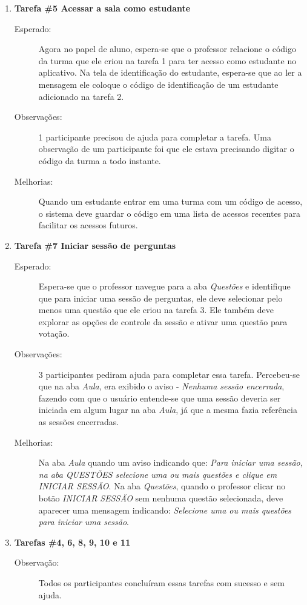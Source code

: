 \begin{enumerate}[label={},leftmargin=*]
  \item \textbf{Tarefa \#5 Acessar a sala como estudante}
  \begin{description}
    \item [Esperado:] Agora no papel de aluno, espera-se que o professor relacione o código da turma que
    ele criou na tarefa 1 para ter acesso como estudante no aplicativo. Na tela de identificação do estudante,
    espera-se que ao ler a mensagem ele coloque o código de identificação de um estudante adicionado na tarefa 2.
    \item [Observações:] 1 participante precisou de ajuda para completar a tarefa. Uma observação de um
    participante foi que ele estava precisando digitar o código da turma a todo instante.
    \item [Melhorias:] Quando um estudante entrar em uma turma com um código de acesso, o sistema
    deve guardar o código em uma lista de acessos recentes para facilitar os acessos futuros.
  \end{description}

  \item \textbf{Tarefa \#7 Iniciar sessão de perguntas}
  \begin{description}
    \item[Esperado:]  Espera-se que o professor navegue para a aba \textit{Questões} e identifique
    que para iniciar uma sessão de perguntas, ele deve selecionar pelo menos uma questão que ele criou
    na tarefa 3. Ele também deve explorar as opções de controle da sessão e ativar uma questão para votação.
    \item[Observações:] 3 participantes pediram ajuda para completar essa tarefa. Percebeu-se que
    na aba \textit{Aula}, era exibido o aviso - \textit{Nenhuma sessão encerrada}, fazendo
    com que o usuário entende-se que uma sessão deveria ser iniciada em algum lugar na aba \textit{Aula}, já que
    a mesma fazia referência as sessões encerradas.
    \item[Melhorias:] Na aba \textit{Aula} quando um aviso indicando que:
    \textit{Para iniciar uma sessão, na aba QUESTÕES selecione uma ou mais questões e clique em INICIAR SESSÃO}.
    Na aba \textit{Questões}, quando o professor clicar no botão \textit{INICIAR SESSÃO} sem nenhuma
    questão selecionada, deve aparecer uma mensagem indicando: \textit{Selecione uma ou mais questões para iniciar uma sessão}.
  \end{description}

  \item \textbf{Tarefas \#4, 6, 8, 9, 10 e 11}
  \begin{description}
    \item [Observação:] Todos os participantes concluíram essas tarefas com sucesso e sem ajuda.
  \end{description}
\end{enumerate}

